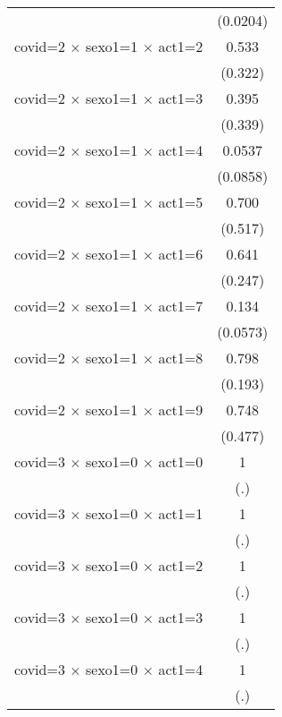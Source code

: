 {\begin{tabular}{l*{1}{c}}
                    &    (0.0204)         \\
[1em]
covid=2 $\times$ sexo1=1 $\times$ act1=2&       0.533         \\
                    &     (0.322)         \\
[1em]
covid=2 $\times$ sexo1=1 $\times$ act1=3&       0.395         \\
                    &     (0.339)         \\
[1em]
covid=2 $\times$ sexo1=1 $\times$ act1=4&      0.0537         \\
                    &    (0.0858)         \\
[1em]
covid=2 $\times$ sexo1=1 $\times$ act1=5&       0.700         \\
                    &     (0.517)         \\
[1em]
covid=2 $\times$ sexo1=1 $\times$ act1=6&       0.641         \\
                    &     (0.247)         \\
[1em]
covid=2 $\times$ sexo1=1 $\times$ act1=7&       0.134\sym{***}\\
                    &    (0.0573)         \\
[1em]
covid=2 $\times$ sexo1=1 $\times$ act1=8&       0.798         \\
                    &     (0.193)         \\
[1em]
covid=2 $\times$ sexo1=1 $\times$ act1=9&       0.748         \\
                    &     (0.477)         \\
[1em]
covid=3 $\times$ sexo1=0 $\times$ act1=0&           1         \\
                    &         (.)         \\
[1em]
covid=3 $\times$ sexo1=0 $\times$ act1=1&           1         \\
                    &         (.)         \\
[1em]
covid=3 $\times$ sexo1=0 $\times$ act1=2&           1         \\
                    &         (.)         \\
[1em]
covid=3 $\times$ sexo1=0 $\times$ act1=3&           1         \\
                    &         (.)         \\
[1em]
covid=3 $\times$ sexo1=0 $\times$ act1=4&           1         \\
                    &         (.)         \\

\end{tabular}}
